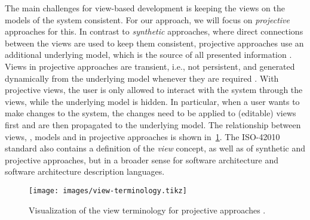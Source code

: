 The main challenges for view-based development is keeping the views on the models of the system consistent.
For our approach, we will focus on \emph{projective} approaches for this.
In contrast to \emph{synthetic} approaches, where direct connections between the views are used to keep them consistent, projective approaches use an additional underlying model, which is the source of all presented information \cite{atkinson_fundamental_2015}.
Views in projective approaches are transient, i.e., not persistent, and generated dynamically from the underlying model whenever they are required \autocite{atkinson_orthographic_2010}.
With projective views, the user is only allowed to interact with the system through the views, while the underlying model is hidden.
In particular, when a user wants to make changes to the system, the changes need to be applied to (editable) views first and are then propagated to the underlying model.
The relationship between views, \viewtypes, models and \metamodels in projective approaches is shown in~\cref{fig:view_concept}.
The ISO-42010 standard \cite{ISO42010} also contains a definition of the \emph{view} concept, as well as of synthetic and projective approaches, but in a broader sense for software architecture and software architecture description languages.

\begin{comment}
There exist \emph{synthetic} and \emph{projective} approaches to view-based modeling \autocite{atkinson_fundamental_2015}.
In the former approaches, the system is represented by the union of all views.
For that purpose, changes must be propagated between the views to ensure the system description is consistent.
This is different in projective approaches where, in addition to the views, an underlying model of the system exists, which is the source of all information.    
\end{comment}

\begin{figure}
    \begin{center}
        \texttt{[image: images/view-terminology.tikz]}
    \end{center}

    \caption{Visualization of the view terminology for projective approaches \autocite{klare_enabling_2021}.}
    \label{fig:view_concept}
\end{figure}

